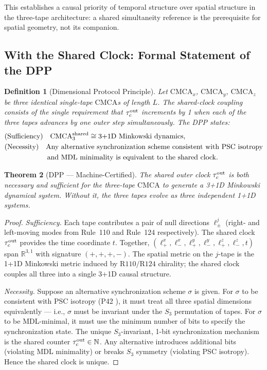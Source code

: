 \documentclass[11pt]{article}
\newtheorem{theorem}{Theorem}[section]
\newtheorem{definition}[theorem]{Definition}
\theoremstyle{remark}
\newcommand{\NN}{\mathbb{N}}
\newcommand{\CMCA}{\text{CMCA}}
\newcommand{\taucout}{\tau_c^{\rm out}}
\begin{document}
This establishes a causal priority of temporal structure over spatial
structure in the three-tape architecture: a shared simultaneity reference
is the prerequisite for spatial geometry, not its companion.

\subsection{With the Shared Clock: Formal Statement of the DPP}

\begin{definition}[Dimensional Protocol Principle]
Let $\mathrm{CMCA}_x$, $\mathrm{CMCA}_y$, $\mathrm{CMCA}_z$ be three
identical single-tape $\CMCA$s of length $L$. The \emph{shared-clock
coupling} consists of the single requirement that $\taucout$ increments by
1 when each of the three tapes advances by one outer step simultaneously.
The DPP states:
\begin{align}
  &\text{(Sufficiency)} \quad
  \text{CMCA}_3^{\rm shared} \cong \text{3+1D Minkowski dynamics}, \\
  &\text{(Necessity)} \quad
  \text{Any alternative synchronization scheme consistent with PSC isotropy}
  \notag \\
  &\qquad\qquad\qquad \text{and MDL minimality is equivalent to the shared
  clock.}
\end{align}
\end{definition}

\begin{theorem}[DPP --- Machine-Certified]
\label{thm:dpp}
The shared outer clock $\taucout$ is both necessary and sufficient for
the three-tape $\CMCA$ to generate a 3+1D Minkowski dynamical system.
Without it, the three tapes evolve as three independent 1+1D systems.
\end{theorem}
\begin{proof}
\emph{Sufficiency.} Each tape contributes a pair of null directions
$\ell_\pm^j$ (right- and left-moving modes from Rule~110 and Rule~124
respectively). The shared clock $\taucout$ provides the time coordinate
$t$. Together, $(\ell_+^x, \ell_-^x, \ell_+^y, \ell_-^y, \ell_+^z,
\ell_-^z, t)$ span $\mathbb{R}^{3,1}$ with signature $(+,+,+,-)$. The
spatial metric on the $j$-tape is the 1+1D Minkowski metric induced by
$\mathrm{R110}/\mathrm{R124}$ chirality; the shared clock couples all three
into a single 3+1D causal structure.

\emph{Necessity.} Suppose an alternative synchronization scheme $\sigma$
is given. For $\sigma$ to be consistent with PSC isotropy (P42
\cite{SpivackPhiMDLField}), it must treat all three spatial dimensions
equivalently — i.e., $\sigma$ must be invariant under the $S_3$ permutation
of tapes. For $\sigma$ to be MDL-minimal, it must use the minimum number
of bits to specify the synchronization state. The unique $S_3$-invariant,
1-bit synchronization mechanism is the shared counter
$\taucout \in \NN$. Any alternative introduces additional bits (violating
MDL minimality) or breaks $S_3$ symmetry (violating PSC isotropy). Hence
the shared clock is unique.
\end{proof}
\end{document}
